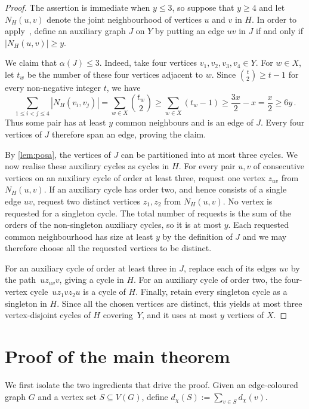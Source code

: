 \documentclass[a4paper,12pt,reqno]{amsart}
\newcommand{\dd}{d_{\chi}}
\begin{document}
\begin{proof}
  The assertion is immediate when $y\le3$, so suppose that $y\ge4$ and let
  $N_H(u,v)$ denote the joint neighbourhood of vertices $u$ and $v$ in $H$. In
  order to apply~, define an auxiliary graph $J$ on $Y$ by
  putting an edge $uv$ in $J$ if and only if $|N_H(u,v)|\ge y$.
  
  We claim that $\alpha(J)\le3$. Indeed, take four vertices
  $v_1,v_2,v_3,v_4\in Y$. For $w\in X$, let $t_w$ be the number of these four
  vertices adjacent to $w$. Since $\binom{t}{2}\ge t-1$ for every
  non-negative integer $t$, we have
  \[
    \sum_{1\le i<j\le4}|N_H(v_i,v_j)|
      =\sum_{w\in X}\binom{t_w}{2}
      \ge\sum_{w\in X}(t_w-1)
      \ge\frac{3x}{2}-x
      =\frac{x}{2}\ge6y\,.
  \]
  Thus some pair has at least $y$ common neighbours and is an edge of $J$.
  Every four vertices of $J$ therefore span an edge, proving the claim.

  By \cref{lem:posa}, the vertices of $J$ can be partitioned into at most three
  cycles. We now realise these auxiliary cycles as cycles in $H$. For every pair
  $u,v$ of consecutive vertices on an auxiliary cycle of order at least three,
  request one vertex $z_{uv}$ from $N_H(u,v)$. If an auxiliary cycle has order
  two, and hence consists of a single edge $uv$, request two distinct vertices
  $z_1,z_2$ from $N_H(u,v)$. No vertex is requested for a singleton cycle. The
  total number of requests is the sum of the orders of the non-singleton
  auxiliary cycles, so it is at most $y$. Each requested common neighbourhood
  has size at least $y$ by the definition of $J$ and we may therefore choose
  all the requested vertices to be distinct.

  For an auxiliary cycle of order at least three in $J$, replace each of its
  edges $uv$ by the path~$u z_{uv}v$, giving a cycle in $H$. For an
  auxiliary cycle of order two, the four-vertex cycle~$uz_1vz_2u$ is a cycle of
  $H$. Finally, retain every singleton cycle as a singleton in $H$. Since all
  the chosen vertices are distinct, this yields at most three vertex-disjoint
  cycles of $H$ covering~$Y$, and it uses at most $y$ vertices of $X$.
\end{proof}

\section{Proof of the main theorem}\label{sec:proof}

We first isolate the two ingredients that drive the proof. Given an
edge-coloured graph $G$ and a vertex set $S\subseteq V(G)$, define
$\dd(S):=\sum_{v\in S}\dd(v)$.
\end{document}
